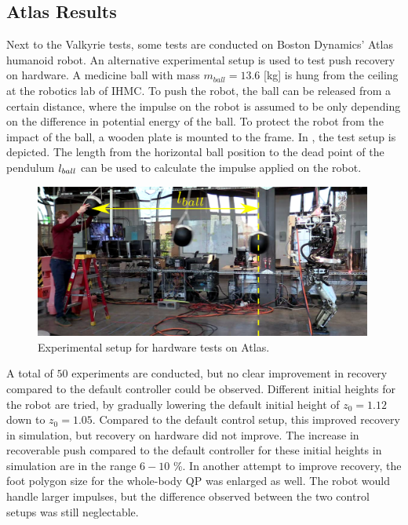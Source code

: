 \subsection{Atlas Results}
Next to the Valkyrie tests, some tests are conducted on Boston Dynamics' Atlas humanoid robot. An alternative experimental setup is used to test push recovery on hardware. A medicine ball with mass $m_{ball}=13.6$ [kg] is hung from the ceiling at the robotics lab of \ac{IHMC}. To push the robot, the ball can be released from a certain distance, where the impulse on the robot is assumed to be only depending on the difference in potential energy of the ball. To protect the robot from the impact of the ball, a wooden plate is mounted to the frame. In , the test setup is depicted. The length from the horizontal ball position to the dead point of the pendulum $l_{ball}$ can be used to calculate the impulse applied on the robot. 
\begin{figure}
\centering
\includegraphics[width=0.99\textwidth]{STYLESTUFF/atlassetup.png}
\caption{Experimental setup for hardware tests on Atlas.}
\label{fig:atlassetup}
\end{figure}

A total of $50$ experiments are conducted, but no clear improvement in recovery compared to the default controller could be observed. Different initial heights for the robot are tried, by gradually lowering the default initial height of $z_0=1.12$ down to $z_0=1.05$. Compared to the default control setup, this improved recovery in simulation, but recovery on hardware did not improve. The increase in recoverable push compared to the default controller for these initial heights in simulation are in the range $6-10$ \%. In another attempt to improve recovery, the foot polygon size for the whole-body \ac{QP} was enlarged as well. The robot would handle larger impulses, but the difference observed between the two control setups was still neglectable.

